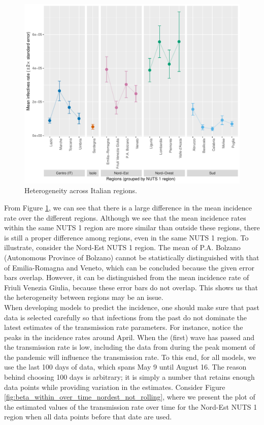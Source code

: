 \documentclass[12pt]{article}
\begin{document}
	\begin{figure}[H]
	    \centering
	    \includegraphics[width=0.94\linewidth]{output/heterogeneity_over_regions.pdf}
	    \caption{Heterogeneity across Italian regions.}
	    \label{fig:heterogeneity_over_regions}
	\end{figure}
	
	From Figure \ref{fig:heterogeneity_over_regions}, we can see that there is a large difference in the mean incidence rate over the different regions. Although we see that the mean incidence rates within the same NUTS 1 region are more similar than outside these regions, there is still a proper difference among regions, even in the same NUTS 1 region. To illustrate, consider the Nord-Est NUTS 1 region. The mean of P.A. Bolzano (Autonomous Province of Bolzano) cannot be statistically distinguished with that of Emilia-Romagna and Veneto, which can be concluded because the given error bars overlap. However, it can be distinguished from the mean incidence rate of Friuli Venezia Giulia, because these error bars do not overlap. This shows us that the heterogeneity between regions may be an issue. \\
	
	When developing models to predict the incidence, one should make sure that past data is selected carefully so that infections from the past do not dominate the latest estimates of the transmission rate parameters. For instance, notice the peaks in the incidence rates around April. When the (first) wave has passed and the transmission rate is low, including the data from during the peak moment of the pandemic will influence the transmission rate. To this end, for all models, we use the last 100 days of data, which spans May 9 until August 16. The reason behind choosing 100 days is arbitrary; it is simply a number that retains enough data points while providing variation in the estimates. Consider Figure \ref{fig:beta_within_over_time_nordest_not_rolling}, where we present the plot of the estimated values of the transmission rate over time for the Nord-Est NUTS 1 region when all data points before that date are used.
	
\end{document}
